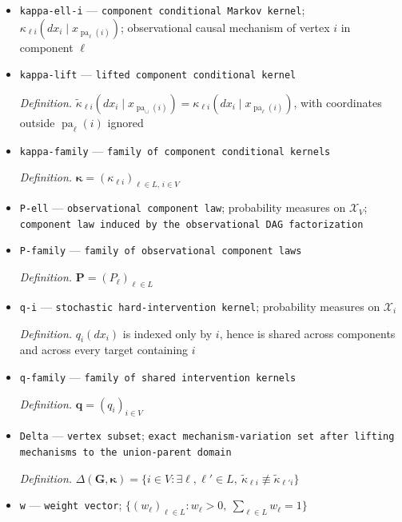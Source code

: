 \documentclass{article}
\begin{document}
\begin{itemize}
  \item \texttt{kappa-\allowbreak{}ell-\allowbreak{}i} --- \texttt{component conditional Markov kernel}; \(\kappa_{\ell i}(dx_i\mid x_{\operatorname{pa}_{\ell}(i)})\); observational causal mechanism of vertex \(i\) in component \(\ell\)
  \item \texttt{kappa-\allowbreak{}lift} --- \texttt{lifted component conditional kernel}
  \par\smallskip\noindent\emph{Definition.} \(\widetilde\kappa_{\ell i}(dx_i\mid x_{\operatorname{pa}_{\cup}(i)})=\kappa_{\ell i}(dx_i\mid x_{\operatorname{pa}_{\ell}(i)})\), with coordinates outside \(\operatorname{pa}_{\ell}(i)\) ignored
  \item \texttt{kappa-\allowbreak{}family} --- \texttt{family of component conditional kernels}
  \par\smallskip\noindent\emph{Definition.} \(\boldsymbol\kappa=(\kappa_{\ell i})_{\ell\in L,\,i\in V}\)
  \item \texttt{P-\allowbreak{}ell} --- \texttt{observational component law}; probability measures on \(\mathcal X_V\); \texttt{component law induced by the observational DAG factorization}
  \item \texttt{P-\allowbreak{}family} --- \texttt{family of observational component laws}
  \par\smallskip\noindent\emph{Definition.} \(\mathbf P=(P_\ell)_{\ell\in L}\)
  \item \texttt{q-\allowbreak{}i} --- \texttt{stochastic hard-\allowbreak{}intervention kernel}; probability measures on \(\mathcal X_i\)
  \par\smallskip\noindent\emph{Definition.} \(q_i(dx_i)\) is indexed only by \(i\), hence is shared across components and across every target containing \(i\)
  \item \texttt{q-\allowbreak{}family} --- \texttt{family of shared intervention kernels}
  \par\smallskip\noindent\emph{Definition.} \(\mathbf q=(q_i)_{i\in V}\)
  \item \texttt{Delta} --- \texttt{vertex subset}; \texttt{exact mechanism-\allowbreak{}variation set after lifting mechanisms to the union-\allowbreak{}parent domain}
  \par\smallskip\noindent\emph{Definition.} \(\Delta(\mathbf G,\boldsymbol\kappa)=\{i\in V:\exists\ell,\ell'\in L,\ \widetilde\kappa_{\ell i}\not\equiv\widetilde\kappa_{\ell' i}\}\)
  \item \texttt{w} --- \texttt{weight vector}; \(\{(w_\ell)_{\ell\in L}:w_\ell>0,\ \sum_{\ell\in L}w_\ell=1\}\)

\end{itemize}
\end{document}
